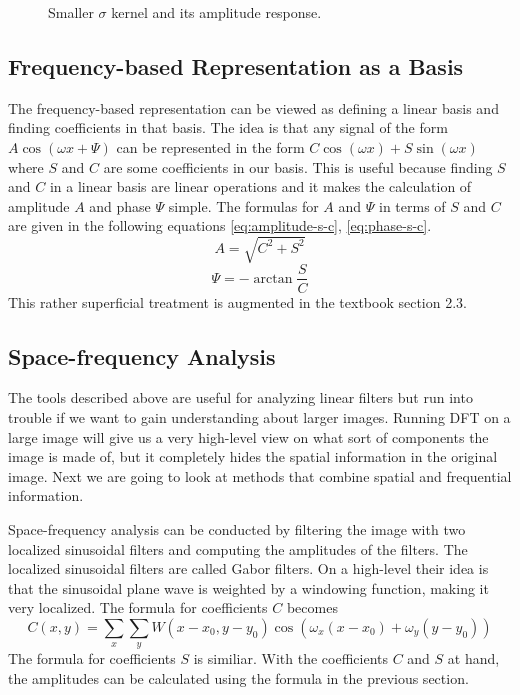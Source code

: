 \documentclass[]{article}
\begin{document}
\begin{figure}
\begin{subfigure}[t]{0.49\textwidth}
    \end{subfigure}
    \caption{Smaller $\sigma$ kernel and its amplitude response.}
    \label{fig:gaussian-kernel-2}
\end{figure}

\subsection{Frequency-based Representation as a Basis}
\label{frequency-based-representation-as-a-basis}
The frequency-based representation can be viewed as defining a linear basis and
finding coefficients in that basis. The idea is that any signal of the form $A
\cos(\omega x + \Psi)$ can be represented in the form $C\cos(\omega x) +
S\sin(\omega x)$ where $S$ and $C$ are some coefficients in our basis. This is
useful because finding $S$ and $C$ in a linear basis are linear operations and it
makes the calculation of amplitude $A$ and phase $\Psi$ simple. The formulas for
$A$ and $\Psi$ in terms of $S$ and $C$ are given in the following equations
\ref{eq:amplitude-s-c}, \ref{eq:phase-s-c}.
\begin{equation}
  \label{eq:amplitude-s-c}
  A = \sqrt{C^{2}+S^{2}}
\end{equation}
\begin{equation}
  \label{eq:phase-s-c}
  \Psi = -\arctan{\frac{S}{C}}
\end{equation}
This rather superficial treatment is augmented in the textbook section 2.3.

\subsection{Space-frequency Analysis}
\label{space-frequency-analysis}
The tools described above are useful for analyzing linear filters but run into
trouble if we want to gain understanding about larger images. Running DFT on a
large image will give us a very high-level view on what sort of components the
image is made of, but it completely hides the spatial information in the
original image. Next we are going to look at methods that combine spatial and
frequential information.

Space-frequency analysis can be conducted by filtering the image with two
localized sinusoidal filters and computing the amplitudes of the filters. The
localized sinusoidal filters are called Gabor filters. On a high-level their
idea is that the sinusoidal plane wave is weighted by a windowing function,
making it very localized. The formula for coefficients $C$ becomes
\begin{equation}
  C(x,y) = \sum_{x}{\sum_{y}{W(x-x_{0}, y-y_{0}) \cos(\omega_{x} (x - x_{0}) + \omega_{y} (y - y_{0})) }}
\end{equation}
The formula for coefficients $S$ is similiar. With the coefficients $C$ and $S$
at hand, the amplitudes can be calculated using the formula in the previous
section.
\end{document}
